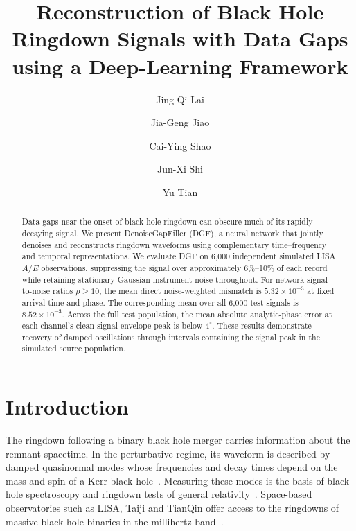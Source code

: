 \documentclass[10pt,prd,aps,a4paper,twocolumn,superscriptaddress,nofootinbib,floatfix]{revtex4-2}
\begin{document}
\title{Reconstruction of Black Hole Ringdown Signals with Data Gaps using a Deep-Learning Framework}
\author{Jing-Qi Lai}
\author{Jia-Geng Jiao}
\author{Cai-Ying Shao}

\author{Jun-Xi Shi}
\author{Yu Tian}

\begin{abstract}
Data gaps near the onset of black hole ringdown can obscure much of its rapidly decaying signal. We present DenoiseGapFiller (DGF), a neural network that jointly denoises and reconstructs ringdown waveforms using complementary time--frequency and temporal representations. We evaluate DGF on 6,000 independent simulated LISA $A/E$ observations, suppressing the signal over approximately 6\%--10\% of each record while retaining stationary Gaussian instrument noise throughout. For network signal-to-noise ratios $\rho\ge10$, the mean direct noise-weighted mismatch is $5.32\times10^{-3}$ at fixed arrival time and phase. The corresponding mean over all 6,000 test signals is $8.52\times10^{-3}$. Across the full test population, the mean absolute analytic-phase error at each channel's clean-signal envelope peak is below $4^\circ$. These results demonstrate recovery of damped oscillations through intervals containing the signal peak in the simulated source population.
\end{abstract}

\maketitle
\section{Introduction}
The ringdown following a binary black hole merger carries information about the remnant spacetime. In the perturbative regime, its waveform is described by damped quasinormal modes whose frequencies and decay times depend on the mass and spin of a Kerr black hole~\cite{berti2006gravitational,berti2009qnm}. Measuring these modes is the basis of black hole spectroscopy and ringdown tests of general relativity~\cite{Isi_2019}. Space-based observatories such as LISA, Taiji and TianQin offer access to the ringdowns of massive black hole binaries in the millihertz band~\cite{amaroseoane2017laserinterferometerspaceantenna,robson2019construction,Ruan2020,Luo2016}.
\end{document}
